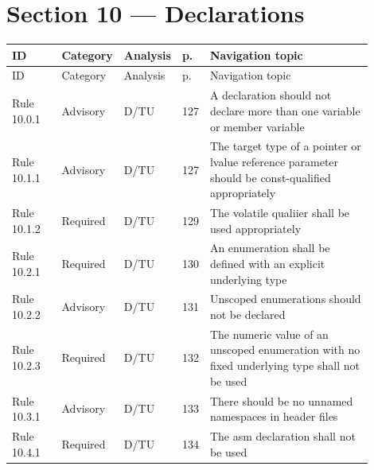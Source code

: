 \documentclass[10pt,letterpaper]{article}
\begin{document}
\section{Section 10 --- Declarations}
\small\setlength{\tabcolsep}{3pt}\renewcommand{\arraystretch}{1.15}
\begin{longtable}{p{0.14\linewidth}p{0.14\linewidth}p{0.1\linewidth}p{0.045\linewidth}p{0.475\linewidth}}
\toprule
ID & Category & Analysis & p. & Navigation topic\\ \midrule
\endfirsthead
\toprule
ID & Category & Analysis & p. & Navigation topic\\ \midrule
\endhead
Rule 10.0.1 & Advisory & D/TU & 127 & A declaration should not declare more than one variable or member variable\\
Rule 10.1.1 & Advisory & D/TU & 127 & The target type of a pointer or lvalue reference parameter should be const-qualified appropriately\\
Rule 10.1.2 & Required & D/TU & 129 & The volatile qualiier shall be used appropriately\\
Rule 10.2.1 & Required & D/TU & 130 & An enumeration shall be defined with an explicit underlying type\\
Rule 10.2.2 & Advisory & D/TU & 131 & Unscoped enumerations should not be declared\\
Rule 10.2.3 & Required & D/TU & 132 & The numeric value of an unscoped enumeration with no fixed underlying type shall not be used\\
Rule 10.3.1 & Advisory & D/TU & 133 & There should be no unnamed namespaces in header files\\
Rule 10.4.1 & Required & D/TU & 134 & The asm declaration shall not be used\\
\bottomrule
\end{longtable}
\normalsize
\end{document}
